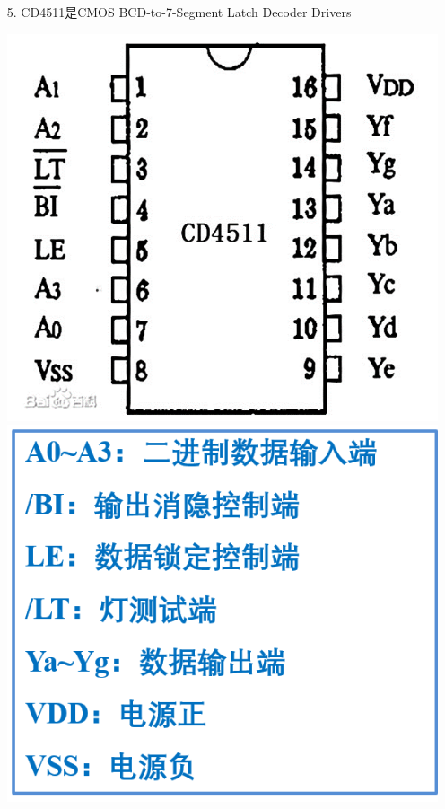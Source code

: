 \documentclass[UTF8]{ctexart}
\begin{document}
\begin{enumerate}
\begin{itemize}
\begin{center}
                    \end{center}
              \item [5.] CD4511是CMOS BCD-to-7-Segment Latch Decoder Drivers\\
                    \begin{center}
                        \includegraphics[scale = 0.5]{5.png}
                        \includegraphics[scale = 0.5]{6.png}

\end{center}
\end{itemize}
\end{enumerate}
\end{document}
